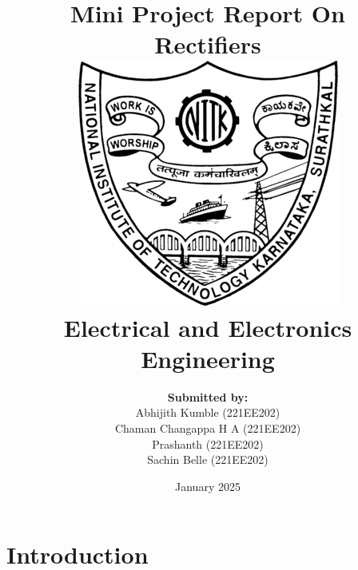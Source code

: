 \documentclass[a4paper, 12pt]{report} %
\title{
    \vspace{-3cm} %
    \textbf{Mini Project Report On} \\
    \vspace{0.5cm}
    \textbf{Rectifiers} \\
    \vspace{1cm}
    \includegraphics[scale=0.5]{NITK_Emblem.png} \\
    \vspace{1cm}
    \textbf{Electrical and Electronics \\ Engineering}
    \vspace{-1cm} %
}
\author{
    \vspace{1cm} %
    \textbf{Submitted by: \\}
    Abhijith Kumble (221EE202)\\ 
    Chaman Changappa H A (221EE202)\\ 
    Prashanth (221EE202)\\ 
    Sachin Belle (221EE202)
}
\date{\vspace{0.5cm}January 2025} %
\affil{
    \vspace{1cm} %
    \textbf{Under the guidance of} \\ 
    Dr. Ravi Raushan \\
    \vspace{0.5cm} %
    \textbf{Department of Electrical and Electronics Engineering} \\
    National Institute of Technology, Surathkal
}
\begin{document}
\singlespacing
\maketitle
\onehalfspacing

\section{Introduction}
\end{document}
